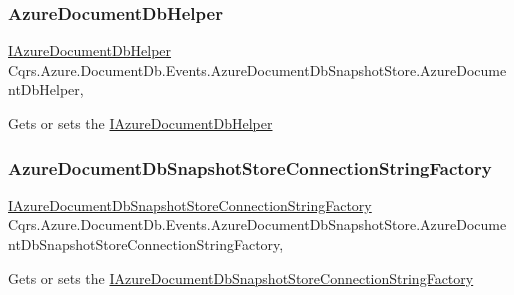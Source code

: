 \subsubsection{\texorpdfstring{Azure\+Document\+Db\+Helper}{AzureDocumentDbHelper}}
{\footnotesize\ttfamily \hyperlink{interfaceCqrs_1_1Azure_1_1DocumentDb_1_1IAzureDocumentDbHelper}{I\+Azure\+Document\+Db\+Helper} Cqrs.\+Azure.\+Document\+Db.\+Events.\+Azure\+Document\+Db\+Snapshot\+Store.\+Azure\+Document\+Db\+Helper\hspace{0.3cm}{\ttfamily [get]}, {\ttfamily [protected]}}



Gets or sets the \hyperlink{interfaceCqrs_1_1Azure_1_1DocumentDb_1_1IAzureDocumentDbHelper}{I\+Azure\+Document\+Db\+Helper} 

\mbox{\label{classCqrs_1_1Azure_1_1DocumentDb_1_1Events_1_1AzureDocumentDbSnapshotStore_abd183070e1a0240ced368408960c9158_abd183070e1a0240ced368408960c9158}} 
\subsubsection{\texorpdfstring{Azure\+Document\+Db\+Snapshot\+Store\+Connection\+String\+Factory}{AzureDocumentDbSnapshotStoreConnectionStringFactory}}
{\footnotesize\ttfamily \hyperlink{interfaceCqrs_1_1Azure_1_1DocumentDb_1_1Events_1_1IAzureDocumentDbSnapshotStoreConnectionStringFactory}{I\+Azure\+Document\+Db\+Snapshot\+Store\+Connection\+String\+Factory} Cqrs.\+Azure.\+Document\+Db.\+Events.\+Azure\+Document\+Db\+Snapshot\+Store.\+Azure\+Document\+Db\+Snapshot\+Store\+Connection\+String\+Factory\hspace{0.3cm}{\ttfamily [get]}, {\ttfamily [protected]}}



Gets or sets the \hyperlink{interfaceCqrs_1_1Azure_1_1DocumentDb_1_1Events_1_1IAzureDocumentDbSnapshotStoreConnectionStringFactory}{I\+Azure\+Document\+Db\+Snapshot\+Store\+Connection\+String\+Factory} 

